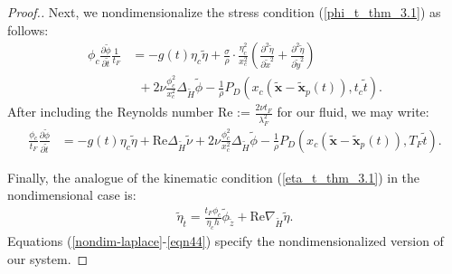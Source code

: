 \documentclass[10pt,a4paper]{amsart}
\newcommand{\M}[1]{\mathbf{#1}}
\newcommand{\ptl}{\partial}
\newcommand{\til}[1]{\widetilde{#1}}
\begin{document}
\begin{proof}[Proof.]
Next, we nondimensionalize the stress condition (\ref{phi_t_thm_3.1}) as follows:
\begin{align*}
    \phi_c \frac{\ptl \til{\phi}}{\ptl \til{t}} \frac{1}{t_F} &= -g(t) \eta_{c} \til{\eta} + \frac{\sigma}{\rho} \cdot \frac{\eta_c^2}{x_c^2} \left( \frac{\ptl^2 \til{\eta}}{\ptl \til{x}^2} + \frac{\ptl^2 \til{\eta}}{\ptl \til{y}^2} \right) \\
    & \, \, \, + 2 \nu \frac{\phi_c^2}{x_c^2} \Delta_{\til{H}}{\til{\phi}} - \frac{1}{\rho} P_D(x_c ({\M{\til{x}}} - {\M{\til{x}}_p(t)}), t_c \til{t}).
\end{align*}
After including the Reynolds number Re := $\frac{2 \nu t_F}{\lambda_F^2}$ for our fluid, we may write:
\begin{align}
\label{eqn33}
    \frac{\phi_c}{t_F} \frac{\ptl \til{\phi}}{\ptl \til{t}} &= -g(t) \eta_{c} \til{\eta} + \mathrm{Re}  \Delta_{\til{H}}{\til{\nu}} + 2 \nu \frac{\phi_c^2}{x_c^2} \Delta_{\til{H}}{\til{\phi}} - \frac{1}{\rho} P_D(x_c ({\M{\til{x}}} - {\M{\til{x}}_p(t)}), T_F \til{t}).
\end{align}

Finally, the analogue of the kinematic condition (\ref{eta_t_thm_3.1}) in the nondimensional case is:
\begin{align}
\label{eqn44}
    \til{\eta}_{\til{t}} = \frac{t_F \phi_c}{\eta_c h} \til{\phi}_{\til{z}} + \mathrm{Re} \nabla_{\til{H}}{\til{\eta}}.
\end{align}
Equations (\ref{nondim-laplace}-\ref{eqn44}) specify the nondimensionalized version of our system.
\end{proof}
\end{document}
